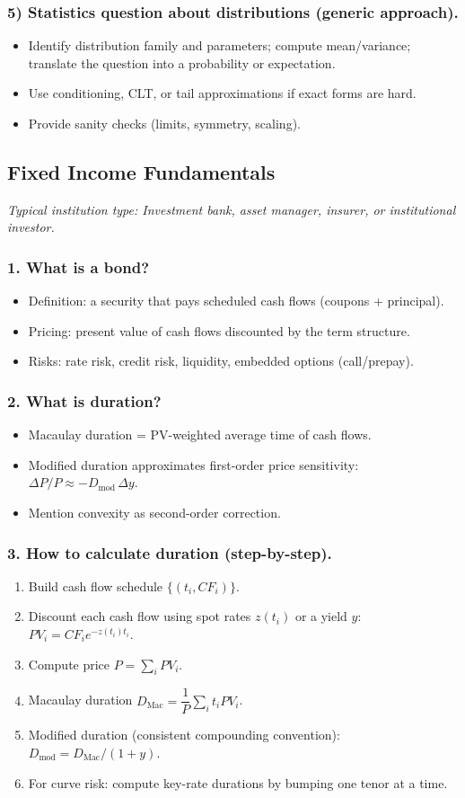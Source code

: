 \documentclass[11pt,letterpaper,openany]{book}
\newcommand{\RoleProfile}[2]{%
  \subsection{#1}%
  \noindent\textit{Typical institution type: #2.}\par
}
\newcommand{\prompt}[1]{\subsubsection*{#1}}
\begin{document}
\prompt{5) Statistics question about distributions (generic approach).}
\begin{itemize}
  \item Identify distribution family and parameters; compute mean/variance; translate the question into a probability or expectation.
  \item Use conditioning, CLT, or tail approximations if exact forms are hard.
  \item Provide sanity checks (limits, symmetry, scaling).
\end{itemize}

\RoleProfile{Fixed Income Fundamentals}{Investment bank, asset manager, insurer, or institutional investor}

\prompt{1. What is a bond?}
\begin{itemize}
  \item Definition: a security that pays scheduled cash flows (coupons + principal).
  \item Pricing: present value of cash flows discounted by the term structure.
  \item Risks: rate risk, credit risk, liquidity, embedded options (call/prepay).
\end{itemize}

\prompt{2. What is duration?}
\begin{itemize}
  \item Macaulay duration = PV-weighted average time of cash flows.
  \item Modified duration approximates first-order price sensitivity: $\Delta P/P \approx -D_{\mathrm{mod}}\,\Delta y$.
  \item Mention convexity as second-order correction.
\end{itemize}

\prompt{3. How to calculate duration (step-by-step).}
\begin{enumerate}
  \item Build cash flow schedule $\{(t_i, CF_i)\}$.
  \item Discount each cash flow using spot rates $z(t_i)$ or a yield $y$: $PV_i = CF_i e^{-z(t_i)t_i}$.
  \item Compute price $P = \sum_i PV_i$.
  \item Macaulay duration $D_{\mathrm{Mac}} = \dfrac{1}{P}\sum_i t_i PV_i$.
  \item Modified duration (consistent compounding convention): $D_{\mathrm{mod}} = D_{\mathrm{Mac}}/(1 + y)$.
  \item For curve risk: compute key-rate durations by bumping one tenor at a time.
\end{enumerate}
\end{document}
